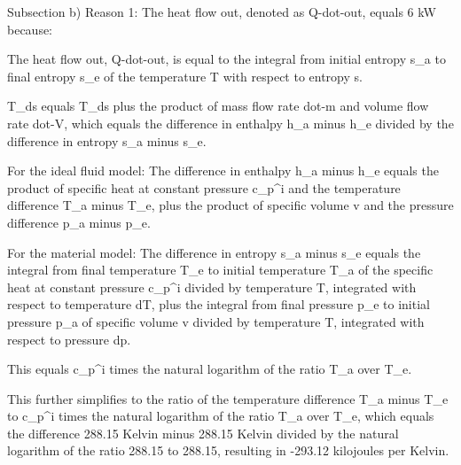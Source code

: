 Subsection b) Reason 1: The heat flow out, denoted as Q-dot-out, equals 6 kW because:

The heat flow out, Q-dot-out, is equal to the integral from initial entropy s_a to final entropy s_e of the temperature T with respect to entropy s.

T_ds equals T_ds plus the product of mass flow rate dot-m and volume flow rate dot-V, which equals the difference in enthalpy h_a minus h_e divided by the difference in entropy s_a minus s_e.

For the ideal fluid model:
The difference in enthalpy h_a minus h_e equals the product of specific heat at constant pressure c_p^i and the temperature difference T_a minus T_e, plus the product of specific volume v and the pressure difference p_a minus p_e.

For the material model:
The difference in entropy s_a minus s_e equals the integral from final temperature T_e to initial temperature T_a of the specific heat at constant pressure c_p^i divided by temperature T, integrated with respect to temperature dT, plus the integral from final pressure p_e to initial pressure p_a of specific volume v divided by temperature T, integrated with respect to pressure dp.

This equals c_p^i times the natural logarithm of the ratio T_a over T_e.

This further simplifies to the ratio of the temperature difference T_a minus T_e to c_p^i times the natural logarithm of the ratio T_a over T_e, which equals the difference 288.15 Kelvin minus 288.15 Kelvin divided by the natural logarithm of the ratio 288.15 to 288.15, resulting in -293.12 kilojoules per Kelvin.